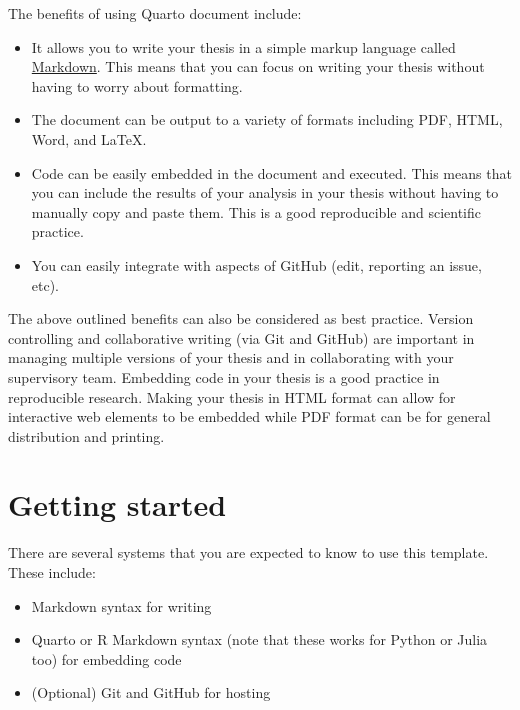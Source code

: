 \documentclass[
  a4paper,
  oneside,
  openany,
  12pt,
  onecolumn]{book}
\providecommand{\tightlist}{%
  \setlength{\itemsep}{0pt}\setlength{\parskip}{0pt}}\usepackage{longtable,booktabs,array}
\theoremstyle{plain}
\theoremstyle{definition}
\theoremstyle{remark}
\begin{document}

The benefits of using Quarto document include:

\begin{itemize}
\tightlist
\item
  It allows you to write your thesis in a simple markup language called
  \href{https://www.markdownguide.org/}{Markdown}. This means that you
  can focus on writing your thesis without having to worry about
  formatting.
\item
  The document can be output to a variety of formats including PDF,
  HTML, Word, and LaTeX.
\item
  Code can be easily embedded in the document and executed. This means
  that you can include the results of your analysis in your thesis
  without having to manually copy and paste them. This is a good
  reproducible and scientific practice.
\item
  You can easily integrate with aspects of GitHub (edit, reporting an
  issue, etc).
\end{itemize}

The above outlined benefits can also be considered as best practice.
Version controlling and collaborative writing (via Git and GitHub) are
important in managing multiple versions of your thesis and in
collaborating with your supervisory team. Embedding code in your thesis
is a good practice in reproducible research. Making your thesis in HTML
format can allow for interactive web elements to be embedded while PDF
format can be for general distribution and printing.

\section*{Getting started}\label{getting-started}


There are several systems that you are expected to know to use this
template. These include:

\begin{itemize}
\tightlist
\item
  Markdown syntax for writing
\item
  Quarto or R Markdown syntax (note that these works for Python or Julia
  too) for embedding code
\item
  (Optional) Git and GitHub for hosting
\end{itemize}
\end{document}
